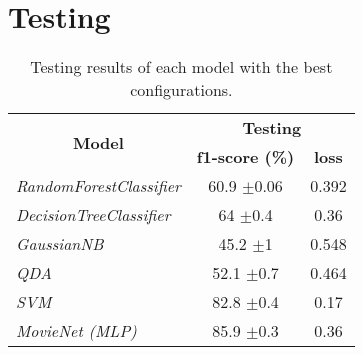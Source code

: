 \documentclass[../main]{subfiles}
\begin{document}
\section{Testing}
\begin{table}[!ht]
    \center
    \begin{tabular}{|l|cc|}
        \hline
        \multicolumn{1}{|c|}{\multirow{2}{*}{\textbf{Model}}} & \multicolumn{2}{c|}{\textbf{Testing}}               \\
        \cline{2-3} 
        \multicolumn{1}{|c|}{}                                & \multicolumn{1}{c|}{\textbf{f1-score (\%)}} & \textbf{loss}  \\ 
        \hline
        \textit{RandomForestClassifier}                       & \multicolumn{1}{c|}{60.9 $\pm$0.06}             & 0.392 \\
        \hline
        \textit{DecisionTreeClassifier}                       & \multicolumn{1}{c|}{64 $\pm$0.4}                & 0.36  \\
        \hline
        \textit{GaussianNB}                                   & \multicolumn{1}{c|}{45.2 $\pm$1}                & 0.548 \\
        \hline
        \textit{QDA}                                          & \multicolumn{1}{c|}{52.1 $\pm$0.7}              & 0.464 \\
        \hline
        \textit{SVM}                                          & \multicolumn{1}{c|}{82.8 $\pm$0.4}              & 0.17  \\
        \hline
        \textit{MovieNet (MLP)}                                     & \multicolumn{1}{c|}{85.9 $\pm$0.3}              & 0.36  \\ \hline
    \end{tabular}
    \caption{Testing results of each model with the best configurations.}
    \label{table:test_results}
\end{table}
\end{document}
